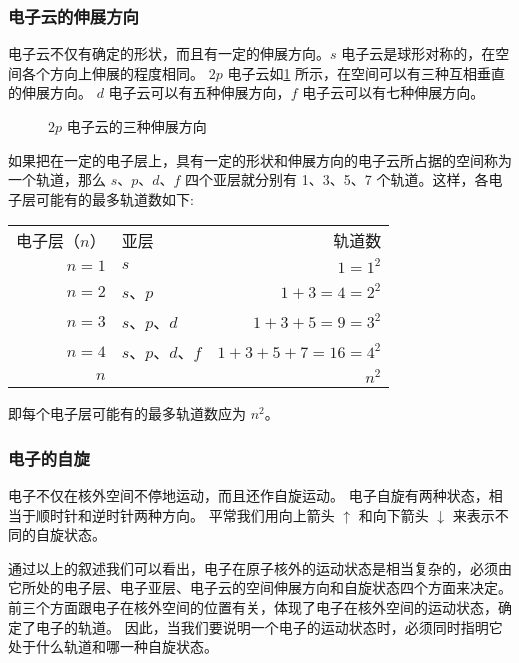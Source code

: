 \subsubsection{电子云的伸展方向}
电子云不仅有确定的形状，而且有一定的伸展方向。$s$ 电子云是球形对称的，在空间各个方向上伸展的程度相同。
$2p$ 电子云如\cref{fig:5-4} 所示，在空间可以有三种互相垂直的伸展方向。
$d$ 电子云可以有五种伸展方向，$f$ 电子云可以有七种伸展方向。
\begin{figure}
  \begin{minipage}{0.32\linewidth}\centering
    \subcaption{}\label{fig:5-4a}
  \end{minipage}
  \begin{minipage}{0.32\linewidth}\centering
    \subcaption{}\label{fig:5-4b}
  \end{minipage}
  \begin{minipage}{0.32\linewidth}\centering
    \subcaption{}\label{fig:5-4c}
  \end{minipage}
  \caption{$2p$ 电子云的三种伸展方向}\label{fig:5-4}
\end{figure}

如果把在一定的电子层上，具有一定的形状和伸展方向的电子云所占据的空间称为一个轨道，那么 $s$、$p$、$d$、$f$ 四个亚层就分别有 1、3、5、7 个轨道。这样，各电子层可能有的最多轨道数如下:

\begin{tabular}{rlr}
  电子层（$n$）& 亚层 & 轨道数 \\
  $n=1$  & $s$                & $1=1^2$ \\
  $n=2$  & $s$、$p$           & $1+3=4=2^2$ \\
  $n=3$  & $s$、$p$、$d$      & $1+3+5=9=3^2$ \\
  $n=4$  & $s$、$p$、$d$、$f$ & $1+3+5+7=16=4^2$ \\
    $n$  &                    & $n^2$ \\
\end{tabular}

\noindent 即每个电子层可能有的最多轨道数应为 $n^2$。

\subsubsection{电子的自旋}
电子不仅在核外空间不停地运动，而且还作自旋运动。
电子自旋有两种状态，相当于顺时针和逆时针两种方向。
平常我们用向上箭头 $\uparrow$ 和向下箭头 $\downarrow$ 来表示不同的自旋状态。

通过以上的叙述我们可以看出，电子在原子核外的运动状态是相当复杂的，必须由它所处的电子层、电子亚层、电子云的空间伸展方向和自旋状态四个方面来决定。前三个方面跟电子在核外空间的位置有关，体现了电子在核外空间的运动状态，确定了电子的轨道。
因此，当我们要说明一个电子的运动状态时，必须同时指明它处于什么轨道和哪一种自旋状态。

